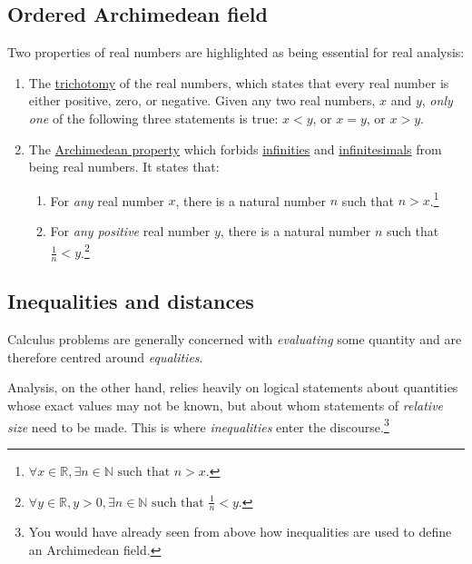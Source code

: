 \documentclass[
  a4paper,
]{article}
\providecommand{\tightlist}{%
  \setlength{\itemsep}{0pt}\setlength{\parskip}{0pt}}
\begin{document}
\subsection{Ordered Archimedean field}\label{ordered-archimedean-field}

Two properties of real numbers are highlighted as being essential for
real analysis:

\begin{enumerate}
\def\labelenumi{\alph{enumi}.}
\item
  The \href{https://en.wikipedia.org/wiki/Law_of_trichotomy}{trichotomy}
  of the real numbers, which states that every real number is either
  positive, zero, or negative. Given any two real numbers, \(x\) and
  \(y\), \emph{only one} of the following three statements is true:
  \(x < y\), or \(x = y\), or \(x > y\).
\item
  The \href{https://planetmath.org/archimedeanproperty}{Archimedean
  property} which forbids
  \href{https://en.wikipedia.org/wiki/Infinity}{infinities} and
  \href{https://en.wikipedia.org/wiki/Infinitesimal}{infinitesimals}
  from being real numbers. It states that:

  \begin{enumerate}
  \def\labelenumii{(\roman{enumii})}
  \tightlist
  \item
    For \emph{any} real number \(x\), there is a natural number \(n\)
    such that \(n > x\).\footnote{\(\forall x \in \mathbb{R}, \exists n \in \mathbb{N} \text{ such that } n > x.\)}
  \item
    For \emph{any positive} real number \(y\), there is a natural number
    \(n\) such that \(\frac{1}{n} < y\).\footnote{\(\forall y \in \mathbb{R}, y > 0, \exists n \in \mathbb{N} \text{ such that } \frac{1}{n} < y\).}
  \end{enumerate}
\end{enumerate}

\subsection{Inequalities and
distances}\label{inequalities-and-distances}

Calculus problems are generally concerned with \emph{evaluating} some
quantity and are therefore centred around \emph{equalities}.

Analysis, on the other hand, relies heavily on logical statements about
quantities whose exact values may not be known, but about whom
statements of \emph{relative size} need to be made. This is where
\emph{inequalities} enter the discourse.\footnote{You would have already
  seen from above how inequalities are used to define an Archimedean
  field.}
\end{document}

